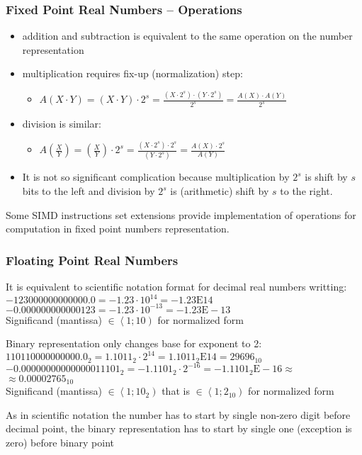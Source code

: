 \documentclass{beamer}
\begin{document}
\begin{frame}
\frametitle{Fixed Point Real Numbers -- Operations}

\begin{itemize}
\item addition and subtraction is equivalent to the same operation on the number representation
\item multiplication requires fix-up (normalization) step:
\begin{itemize}
\item $A(X \cdot Y) = (X \cdot Y ) \cdot 2^s = \frac{(X \cdot 2^s)\cdot( Y\cdot 2^s) }{2^s} = \frac{A(X) \cdot A(Y)}{2^s}$
\end{itemize}
\item division is similar:
\begin{itemize}
\item $A(\frac{X}{Y}) = (\frac{X}{Y}) \cdot 2^s = \frac{(X \cdot 2^s)\cdot2^s }{( Y\cdot 2^s)} = \frac{A(X) \cdot 2^s}{A(Y)}$
\end{itemize}
\item It is not so significant complication because multiplication by $2^s$ is shift by $s$ bits to the left and division by $2^s$ is (arithmetic) shift by $s$ to the right.
\end{itemize}

\bigskip

Some SIMD instructions set extensions provide implementation of operations for computation in fixed point numbers representation.

\end{frame}


\begin{frame}
\frametitle{Floating Point Real Numbers }

\bigskip

It is equivalent to scientific notation format for decimal real numbers writting:
$-123 000 000 000 000.0 = -1.23 \cdot 10^{14} = -1.23\text{E} 14$\\
$-0.000 000 000 000 123 = -1.23 \cdot 10^{-13} = -1.23\text{E}-13$\\
Significand (mantissa) $\in \left\langle 1; 10 \right)$ for normalized form
\bigskip

Binary representation only changes base for exponent to 2:\\
$110 1100 0000 0000.0_2 = 1.1011_2 \cdot 2^{14} = 1.1011_2\text{E} 14 = 29696_{10}$\\
$-0.0000 0000 0000 0001 1101_2 = -1.1101_2 \cdot 2^{-16} = -1.1101_2\text{E}-16 \approx$\\
\phantom{xxxxxxxxxxxxxxxxxxxxxxxxxxxxxxxxxxxxxxxxxxxx}$\approx0.00002765_{10}$\\
Significand (mantissa) $\in \left\langle 1; 10_2 \right)$ that is
$\in \left\langle 1; 2_{10} \right)$ for normalized form
\bigskip

As in scientific notation the number has to start by single non-zero digit before decimal point, the binary representation has to start by single one (exception is zero) before binary point


\end{frame}
\end{document}
